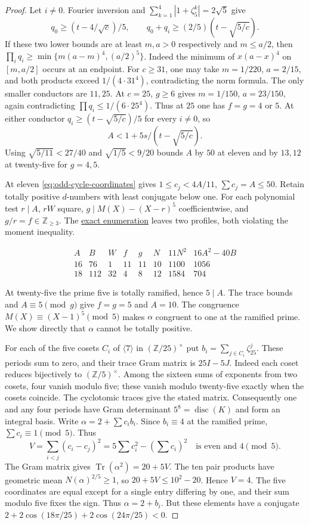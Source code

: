 \documentclass[11pt,reqno]{amsart}
\newcommand{\codecheck}[2]{\href{https://github.com/sebastienpalcoux/grothendieck-ring-classification/blob/d5750105bb5758f3ad38d2e5464dfcc12c019816/supplements/rank6/sphericality/#1}{#2}}
\theoremstyle{remark}\newtheorem{remark}[theorem]{Remark}
\numberwithin{equation}{section}
\begin{document}
\begin{proof}
Let $i\ne0$. Fourier inversion and
$\sum_{k=1}^4|1+\zeta_5^k|=2\sqrt5$ give
\[
 q_0\ge(t-4/\sqrt c)/5,\qquad
 q_0+q_i\ge (2/5)(t-\sqrt{5/c}).
\]
If these two lower bounds are at least $m,a>0$ respectively and
$m\le a/2$, then $\prod_iq_i\ge\min\{m(a-m)^4,(a/2)^5\}$.
Indeed the minimum of $x(a-x)^4$ on $[m,a/2]$ occurs at an endpoint.
For $c\ge31$, one may take $m=1/220$, $a=2/15$, and both products
exceed $1/(4\cdot31^4)$, contradicting the norm formula. The only
smaller conductors are $11,25$. At $c=25$, $g\ge6$ gives
$m=1/150$, $a=23/150$, again contradicting $\prod q_i\le1/(6\cdot25^4)$.
Thus at $25$ one has $f=g=4$ or $5$. At either conductor $q_i\ge
(t-\sqrt{5/c})/5$ for every $i\ne0$, so
\[
  A<1+5s/(t-\sqrt{5/c}).
\]
Using $\sqrt{5/11}<27/40$ and $\sqrt{1/5}<9/20$ bounds $A$ by $50$
at eleven and by $13,12$ at twenty-five for $g=4,5$.

At eleven \eqref{eq:odd-cycle-coordinates} gives
$1\le c_j<4A/11$, $\sum c_j=A\le50$. Retain totally positive
$d$-numbers with least conjugate below one. For each polynomial
test $r\mid A$, $rW$ square, $g\mid M(X)-(X-r)^5$ coefficientwise,
and $g/r=f\in\mathbb Z_{\ge3}$. The \codecheck{odd_degree_checks/higher_degree_quintic.py}{exact enumeration}
leaves two profiles, both violating the moment inequality.

\[
\begin{array}{rrrrrr|rr}
 A&B&W&f&g&N&11N^2&16A^2-40B\\\hline
 16&76&1&11&11&10&1100&1056\\
 18&112&32&4&8&12&1584&704
\end{array}
\]

At twenty-five the prime five is totally ramified, hence $5\mid A$.
The trace bounds and $A\equiv5\pmod g$ give $f=g=5$ and $A=10$.
The congruence $M(X)\equiv(X-1)^5\pmod5$ makes $\alpha$ congruent
to one at the ramified prime. We show directly that $\alpha$ cannot
be totally positive.

For each of the five cosets $C_i$ of $\langle7\rangle$ in
$(\mathbb Z/25)^\times$ put $b_i=\sum_{j\in C_i}\zeta_{25}^j$.
These periods sum to zero, and their trace Gram matrix is $25I-5J$.
Indeed each coset reduces bijectively to $(\mathbb Z/5)^\times$.
Among the sixteen sums of exponents from two cosets, four vanish
modulo five; these vanish modulo twenty-five exactly when the cosets
coincide. The cyclotomic traces give the stated matrix.
Consequently one and any four periods have Gram determinant
$5^8=\operatorname{disc}(K)$ and form an integral basis.
Write $\alpha=2+\sum c_i b_i$. Since $b_i\equiv4$ at the ramified
prime, $\sum c_i\equiv1\pmod5$. Thus
\[
 V=\sum_{i<j}(c_i-c_j)^2=5\sum c_i^2-(\sum c_i)^2
 \quad\text{is even and }4\pmod5.
\]
The Gram matrix gives $\operatorname{Tr}(\alpha^2)=20+5V$.
The ten pair products have geometric mean $N(\alpha)^{2/5}\ge1$,
so $20+5V\le10^2-20$. Hence $V=4$. The five coordinates are
equal except for a single entry differing by one, and their sum
modulo five fixes the sign. Thus $\alpha=2+b_i$. But these elements
have a conjugate $2+2\cos(18\pi/25)+2\cos(24\pi/25)<0$.

\end{proof}
\end{document}
